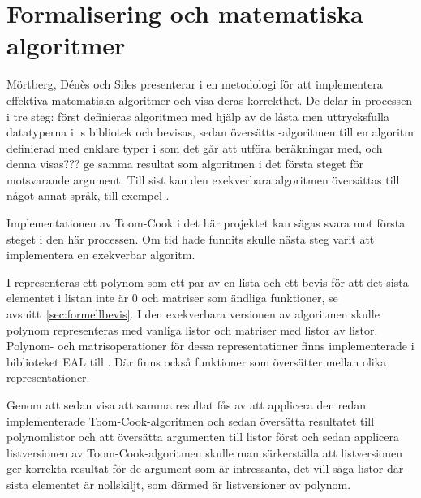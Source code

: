 \section{Formalisering och matematiska algoritmer}
\label{sec:exekverbar}
Mörtberg, Dénès och Siles presenterar i \cite{denes2012refinement} en
metodologi för att implementera effektiva matematiska algoritmer och visa deras
korrekthet. De delar in processen i tre steg: först definieras algoritmen med
hjälp av de låsta men uttrycksfulla datatyperna i \ssr{}:s bibliotek och
bevisas, sedan översätts \ssr{}-algoritmen till en algoritm definierad med
enklare typer i \ssr{} som det går att utföra beräkningar med, och denna
visas??? ge samma resultat som algoritmen i det första steget för motsvarande
argument. Till sist kan den exekverbara algoritmen översättas till något annat
språk, till exempel \haskell{}.

Implementationen av Toom-Cook i det här projektet kan sägas svara mot första
steget i den här processen. Om tid hade funnits skulle nästa steg varit att
implementera en exekverbar algoritm.

I \ssr{} representeras ett polynom som ett par av en lista och ett bevis för
att det sista elementet i listan inte är 0 och matriser som ändliga funktioner,
se avsnitt~\ref{sec:formellbevis}. I den exekverbara versionen av algoritmen skulle
polynom representeras med vanliga listor och matriser med listor av listor.
Polynom- och matrisoperationer för dessa representationer finns implementerade
i biblioteket \coq{}EAL\cite{coqeal} till \coq{}. Där finns också funktioner
som översätter mellan olika representationer.

Genom att sedan visa att samma resultat fås av att applicera den redan
implementerade Toom-Cook-algoritmen och sedan översätta resultatet till
polynomlistor och att översätta argumenten till listor först och sedan
applicera listversionen av Toom-Cook-algoritmen skulle man särkerställa att
listversionen ger korrekta resultat för de argument som är intressanta, det
vill säga listor där sista elementet är nollskiljt, som därmed är listversioner
av polynom.
